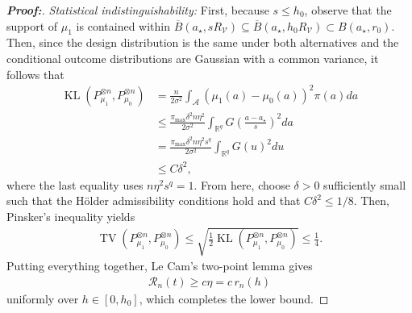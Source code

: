 \documentclass[11pt,twoside]{article}
\theoremstyle{definition}
\theoremstyle{remark}
\begin{document}
\begin{proof}[\textbf{Proof:}]
\textit{Statistical indistinguishability:} First, because $s \leq h_0$, observe that the support of $\mu_1$ is contained within $\overline{B}(a_\star,sR_{\mathcal{V}}) \subseteq \overline{B}(a_\star,h_0R_{\mathcal{V}}) \subset B(a_\star,r_0)$. Then, since the design distribution is the same under both alternatives and the conditional outcome distributions are Gaussian with a common variance, it follows that
\begin{align*}
    \operatorname{KL}\!\left(P_{\mu_1}^{\otimes n}, P_{\mu_0}^{\otimes n}\right) &= \frac{n}{2\sigma^2} \int_{\mathcal{A}} (\mu_1(a)-\mu_0(a))^2 \pi(a)da \\
    &\leq \frac{\pi_{\max}\delta^2n\eta^2}{2\sigma^2} \int_{\mathbb{R}^q} G\!\left(\frac{a-a_\star}{s}\right)^2 da \\
    &= \frac{\pi_{\max}\delta^2n\eta^2s^q}{2\sigma^2} \int_{\mathbb{R}^q}G(u)^2du \\
    &\leq C\delta^2,
\end{align*}
where the last equality uses $n\eta^2s^q=1$. From here, choose $\delta > 0$ sufficiently small such that the H\"older admissibility conditions hold and that $C\delta^2 \leq 1/8$. Then, Pinsker's inequality \citep{tsbakov2009} yields
\begin{align*}
        \operatorname{TV}\!\left( P_{\mu_1}^{\otimes n}, P_{\mu_0}^{\otimes n} \right) \leq \sqrt{
        \frac{1}{2} \operatorname{KL}\!\left( P_{\mu_1}^{\otimes n}, P_{\mu_0}^{\otimes n} \right)}\leq \frac{1}{4}.
\end{align*}
Putting everything together, Le Cam's two-point lemma gives
\begin{align*}
     \mathcal{R}_n(t) \geq c\eta = c\,r_n(h)
\end{align*}
uniformly over $h\in[0,h_0]$, which completes the lower bound. 

\medskip


\end{proof}
\end{document}

